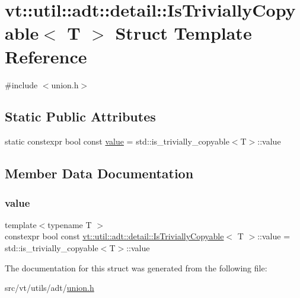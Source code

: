 \hypertarget{structvt_1_1util_1_1adt_1_1detail_1_1_is_trivially_copyable_3_01_t_01_4}{}\section{vt\+:\+:util\+:\+:adt\+:\+:detail\+:\+:Is\+Trivially\+Copyable$<$ T $>$ Struct Template Reference}
\label{structvt_1_1util_1_1adt_1_1detail_1_1_is_trivially_copyable_3_01_t_01_4}


{\ttfamily \#include $<$union.\+h$>$}

\subsection*{Static Public Attributes}
\begin{DoxyCompactItemize}
\item 
static constexpr bool const \hyperlink{structvt_1_1util_1_1adt_1_1detail_1_1_is_trivially_copyable_3_01_t_01_4_a0df35a6b10221e3dadc10c67b6c56c39}{value} = std\+::is\+\_\+trivially\+\_\+copyable$<$T$>$\+::value
\end{DoxyCompactItemize}


\subsection{Member Data Documentation}
\mbox{\label{structvt_1_1util_1_1adt_1_1detail_1_1_is_trivially_copyable_3_01_t_01_4_a0df35a6b10221e3dadc10c67b6c56c39}} 
\subsubsection{\texorpdfstring{value}{value}}
{\footnotesize\ttfamily template$<$typename T $>$ \\
constexpr bool const \hyperlink{structvt_1_1util_1_1adt_1_1detail_1_1_is_trivially_copyable}{vt\+::util\+::adt\+::detail\+::\+Is\+Trivially\+Copyable}$<$ T $>$\+::value = std\+::is\+\_\+trivially\+\_\+copyable$<$T$>$\+::value\hspace{0.3cm}{\ttfamily [static]}}



The documentation for this struct was generated from the following file\+:\begin{DoxyCompactItemize}
\item 
src/vt/utils/adt/\hyperlink{union_8h}{union.\+h}\end{DoxyCompactItemize}
